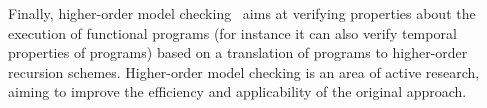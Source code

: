 Finally, higher-order model checking~\cite{koba-ppdp09,koba-popl09} aims at verifying
properties about the execution of functional programs (for instance it can also verify
temporal properties of programs) based on a translation of programs to higher-order 
recursion schemes. Higher-order model checking is an area of active research, aiming to 
improve the efficiency and applicability of the original approach.

